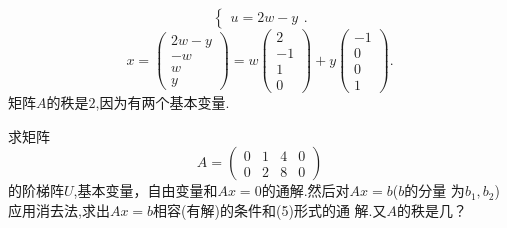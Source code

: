 ﻿\documentclass{book} \usepackage{exsheets} \usepackage{xeCJK}
\begin{document}
\begin{solution}
$$\begin{cases}
  u=2w-y
\end{cases}.
$$
$$
x=
\begin{pmatrix}
  2w-y\\
  -w\\
  w\\
  y
\end{pmatrix}=w
\begin{pmatrix}
  2\\
  -1\\
  1\\
  0
\end{pmatrix}+y
\begin{pmatrix}
  -1\\
  0\\
  0\\
  1
\end{pmatrix}.
$$
矩阵$A$的秩是$2$,因为有两个基本变量.
\end{solution}
\begin{question}
  求矩阵
$$
A=
\begin{pmatrix}
  0&1&4&0\\
  0&2&8&0
\end{pmatrix}
$$
的阶梯阵$U$,基本变量，自由变量和$Ax=0$的通解.然后对$Ax=b$($b$的分量
为$b_1,b_2$)应用消去法,求出$Ax=b$相容(有解)的条件和(5)形式的通
解.又$A$的秩是几？
\end{question}
\end{document}
